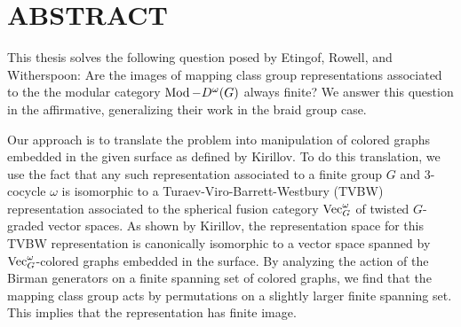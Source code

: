 %
%
%
%

\chapter*{ABSTRACT}

\pagestyle{plain} %
\setcounter{page}{2}

\indent
This thesis solves the following question posed by Etingof, Rowell, and Witherspoon:  Are the images of mapping class group representations associated to the the modular category $\operatorname{Mod}-D^\omega(G)$ always finite? We answer this question in the affirmative, generalizing their work in the braid group case.

Our approach is to translate the problem into manipulation of colored graphs embedded in the given surface as defined by Kirillov. To do this translation, we use the fact that any such representation associated to a finite group $G$ and 3-cocycle $\omega$ is isomorphic to a Turaev-Viro-Barrett-Westbury (TVBW) representation associated to the spherical fusion category $\operatorname{Vec}_G^\omega$ of twisted $G$-graded vector spaces. As shown by Kirillov, the representation space for this TVBW representation is canonically isomorphic to a vector space spanned by $\operatorname{Vec}_G^\omega$-colored graphs embedded in the surface. By analyzing the action of the Birman generators on a finite spanning set of colored graphs, we find that the mapping class group acts by permutations on a slightly larger finite spanning set. This implies that the representation has finite image.

\pagebreak{}
